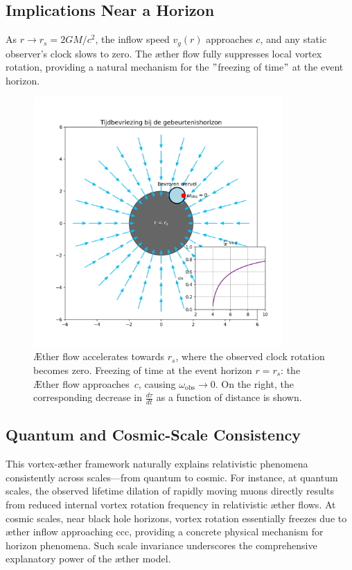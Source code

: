 \subsection*{Implications Near a Horizon}

As $r \to r_s = 2GM/c^2$, the inflow speed $v_g(r)$ approaches $c$, and any static observer's clock slows to zero. The æther flow fully suppresses local vortex rotation, providing a natural mechanism for the \("\)freezing of time\("\) at the event horizon.

\begin{figure}[htbp]
    \centering
    \includegraphics[width=0.85\textwidth]{10-HorizonTijdsbevriezing}
    \caption{Æther flow accelerates towards $r_s$, where the observed clock rotation becomes zero. Freezing of time at the event horizon $r = r_s$: the Æther flow approaches~$c$, causing $\omega_{\mathrm{obs}} \to 0$. On the right, the corresponding decrease in $\frac{d\tau}{dt}$ as a function of distance is shown.}
    \label{fig:HorizonTijdsbevriezing}
\end{figure}


\subsection*{Quantum and Cosmic-Scale Consistency}

This vortex-æther framework naturally explains relativistic phenomena consistently across scales—from quantum to cosmic. For instance, at quantum scales, the observed lifetime dilation of rapidly moving muons directly results from reduced internal vortex rotation frequency in relativistic æther flows. At cosmic scales, near black hole horizons, vortex rotation essentially freezes due to æther inflow approaching ccc, providing a concrete physical mechanism for horizon phenomena. Such scale invariance underscores the comprehensive explanatory power of the æther model.

